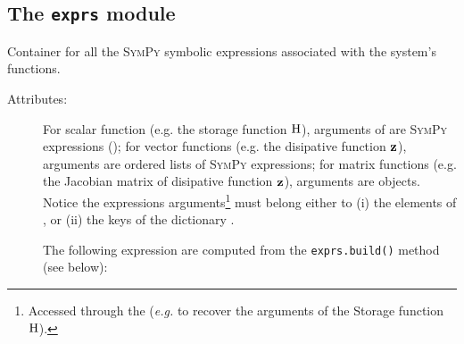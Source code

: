 \documentclass[10pt,a4paper]{article}
\begin{document}
\subsection{The \texttt{exprs} module} Container for all the \textsc{SymPy} symbolic expressions associated with the system's functions.
\begin{description}
%
\item[Attributes:] For scalar function (e.g. the storage function ${\mathrm{H}}$), arguments of  are \textsc{SymPy} expressions (); for vector functions (e.g. the disipative function ${\mathbf{z}}$), arguments are ordered lists of \textsc{SymPy} expressions; for matrix functions (e.g. the Jacobian matrix of disipative function ${\mathbf{z}}$), arguments are  objects. Notice the expressions arguments\footnote{Accessed through the  (\textit{e.g.}  to recover the arguments of the Storage function ${\mathrm{H}}$).} must belong either to (i) the elements of , or (ii) the keys of the dictionary .
%
%
The following expression are computed from the \texttt{exprs.build()} method (see below):
%
\end{description}
\end{document}
